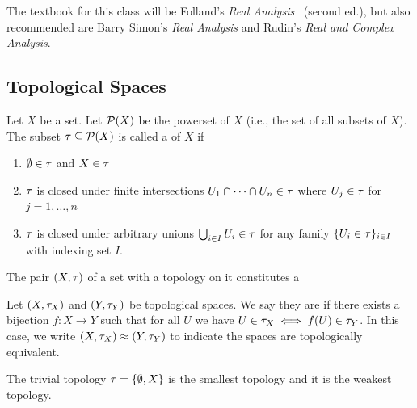 
\lecture{}

\begin{node}
The textbook for this class will be Folland's \textit{Real Analysis}~\cite{folland1999real}
(second ed.), but also recommended are Barry Simon's \textit{Real Analysis}
and Rudin's \textit{Real and Complex Analysis}.
\end{node}

\subsection{Topological Spaces}

\begin{definition}
Let $X$ be a set. Let $\mathcal{P}(X)$ be the powerset of $X$ (i.e., the
set of all subsets of $X$). The subset $\tau\subseteq\mathcal{P}(X)$ is
called a  of $X$ if
\begin{enumerate}
\item $\emptyset\in\tau$ and $X\in\tau$
\item $\tau$ is closed under finite intersections $U_{1}\cap\cdots\cap U_{n}\in\tau$
  where $U_{j}\in\tau$ for $j=1,\dots,n$
\item $\tau$ is closed under arbitrary unions $\bigcup_{i\in I}U_{i}\in\tau$
  for any family $\{U_{i}\in\tau\}_{i\in I}$ with indexing set $I$.
\end{enumerate}
The pair $(X,\tau)$ of a set with a topology on it constitutes a
\end{definition}

\begin{definition}
Let $(X,\tau_{X})$ and $(Y,\tau_{Y})$ be topological spaces.
We say they are  if there exists a
bijection $f\colon X\to Y$ such that for all $U$ we have
$U\in\tau_{X}\iff f(U)\in\tau_{Y}$. In this case, we write
$(X,\tau_{X})\approx(Y,\tau_{Y})$ to indicate the spaces are
topologically equivalent.
\end{definition}

\begin{example}
The trivial topology $\tau=\{\emptyset,X\}$ is the smallest topology
and it is the weakest topology.
\end{example}


